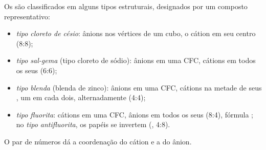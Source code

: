 \begin{definition}\label{def:b1:crystals-ionic-covalent:structure-type}
Os  são classificados em alguns tipos estruturais,
designados por um composto representativo:
\begin{itemize}
  \item \emph{tipo cloreto de césio}: ânions
        nos vértices de um cubo, o cátion em seu centro (8:8);
  \item \emph{tipo sal-gema} (tipo cloreto de
        sódio): ânions em uma  CFC, cátions em todos os seus  (6:6);
  \item \emph{tipo blenda} (blenda de zinco): ânions
        em uma  CFC, cátions na metade de seus ,
        um em cada dois, alternadamente (4:4);
  \item \emph{tipo fluorita}: cátions em uma 
        CFC, ânions em todos os seus  (8:4), fórmula
        ; no \emph{tipo antifluorita},
        os papéis se invertem (, 4:8).
\end{itemize}
O par de números dá a coordenação do cátion e a do ânion.
\end{definition}

